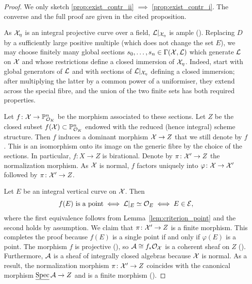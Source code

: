 \begin{proof}
    We only sketch \ref{prop:exist_contr_ii} $\implies$ \ref{prop:exist_contr_i}.
    The converse and the full proof are given in the cited proposition.

    As $\mathcal X_\eta$ is an integral projective curve over a field, $\mathcal{L}|_{\mathcal X_\eta}$
    is ample (\cite[Proposition 7.5.5]{Liu}). Replacing $D$ by a sufficiently large positive multiple (which
    does not change the set $E$), we may choose finitely many global sections $s_0,\ldots,s_n\in\Gamma(\mathcal X,\mathcal{L})$ which generate $\mathcal{L}$ on $\mathcal X$
    and whose restrictions define a closed immersion of $\mathcal X_\eta$.
    Indeed, start with global generators of $\mathcal{L}$ and with sections of $\mathcal{L}|_{\mathcal X_\eta}$ defining a closed immersion;
    after multiplying the latter by a common power of a uniformiser, they extend across the special fibre, and the union of the two finite sets has both required properties.

    Let $f \colon \mathcal X \to \mathbb P^n_{\mathcal O_K}$ be the morphism associated to these sections.
    Let $Z$ be the closed subset $f(\mathcal X) \subset \mathbb P^n_{\mathcal O_K}$
    endowed with the reduced (hence integral) scheme structure.
    Then $f$ induces a dominant morphism $\mathcal X \to Z$ that we still denote by $f$.
    This is an isomorphism onto its image on the generic fibre by the choice of the sections.
    In particular, $f \colon X \to Z$ is birational.
    Denote by $\pi \colon \mathcal X' \to Z$ the normalization morphism.
    As $\mathcal X$ is normal, $f$ factors uniquely into $\varphi \colon \mathcal X \to \mathcal X'$ followed by $\pi \colon \mathcal X' \to Z$.
    \begin{center}
    \end{center}
    Let $E$ be an integral vertical curve on $\mathcal X$.
    Then
    \[
        f(E) \textrm{ is a point} \iff \mathcal{L}|_E \simeq \mathcal{O}_E \iff E \in \mathcal{E},
    \]
    where the first equivalence follows from Lemma~\ref{lem:criterion_point} and the second holds by assumption.
    We claim that $\pi \colon \mathcal X' \to Z$ is a finite morphism.
    This completes the proof because $f(E)$ is a single point if and only if $\varphi(E)$ is a point.
    The morphism $f$ is projective (\cite[Corollary 3.3.32(e)]{Liu}), so $\mathcal{A} \cong f_*\mathcal{O}_\mathcal X$ is a coherent
    sheaf on $Z$ (\cite[Corollary 5.3.5]{Liu}). Furthermore, $\mathcal{A}$ is a sheaf of integrally closed algebras because $\mathcal X$ is normal.
    As a result, the normalization morphism $\pi \colon \mathcal X' \to Z$
    coincides with the canonical morphism $\operatorname{\underline{Spec}} \mathcal{A} \to Z$ and is a finite morphism (\cite[Exercise 5.1.17]{Liu}).
\end{proof}

